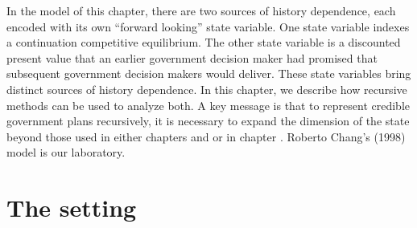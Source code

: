 %
%
%
%
In the model of this chapter, there are two sources of history dependence, each encoded with its own ``forward looking'' state variable.  One state variable
indexes  a continuation competitive equilibrium. The other state variable is a discounted present value that an earlier government decision maker had
promised that  subsequent government decision makers would deliver. These state variables bring   distinct  sources of history dependence.  In this chapter, we describe how recursive methods can be used to analyze both. A key message  is that to represent credible government plans recursively, it is necessary
 to expand the dimension of the state beyond those used in either chapters  and    or in chapter .
  Roberto Chang's (1998) model is our laboratory.

\newpage

\section{The setting}

